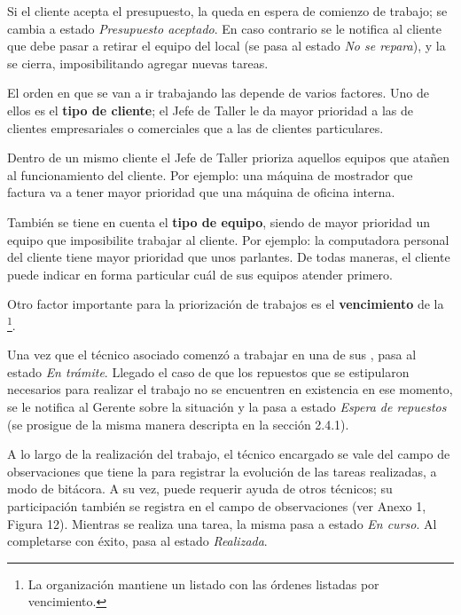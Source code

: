 \documentclass[12pt]{extarticle}
\begin{document}
\begin{spacing}{1.2}
    Si el cliente acepta el presupuesto, la \OT{} queda en espera de comienzo de trabajo; se cambia a estado \textit{Presupuesto aceptado}. En caso contrario se le notifica al cliente que debe pasar a retirar el equipo del local (se pasa al estado \textit{No se repara}), y la \OT{} se cierra, imposibilitando agregar nuevas tareas.

    El orden en que se van a ir trabajando las \OTs{} depende de varios factores. Uno de ellos es el \textbf{tipo de cliente}; el Jefe de Taller le da mayor prioridad a las \OTs{} de clientes empresariales o comerciales que a las de clientes particulares.

    Dentro de un mismo cliente el Jefe de Taller prioriza aquellos equipos que atañen al funcionamiento del cliente. Por ejemplo: una máquina de mostrador que factura va a tener mayor prioridad que una máquina de oficina interna.

    También se tiene en cuenta el \textbf{tipo de equipo}, siendo de mayor prioridad un equipo que imposibilite trabajar al cliente. Por ejemplo: la computadora personal del cliente tiene mayor prioridad que unos parlantes.
    De todas maneras, el cliente puede indicar en forma particular cuál de sus equipos atender primero.

    Otro factor importante para la priorización de trabajos es el \textbf{vencimiento} de la \OT{}\footnote{La organización mantiene un listado con las órdenes listadas por vencimiento.}. 
    
    Una vez que el técnico asociado comenzó a trabajar en una de sus \OT{}, pasa al estado \textit{En trámite}. Llegado el caso de que los repuestos que se estipularon necesarios para realizar el trabajo no se encuentren en existencia en ese momento, se le notifica al Gerente sobre la situación y la \OT{} pasa a estado \textit{Espera de repuestos} (se prosigue de la misma manera descripta en la sección 2.4.1).

    A lo largo de la realización del trabajo, el técnico encargado se vale del campo de observaciones que tiene la \OT{} para registrar la evolución de las tareas realizadas, a modo de bitácora. A su vez, puede requerir ayuda de otros técnicos; su participación también se registra en el campo de observaciones (ver Anexo 1, Figura 12). Mientras se realiza una tarea, la misma pasa a estado \textit{En curso}. Al completarse con éxito, pasa al estado \textit{Realizada}.
    

\end{spacing}
\end{document}
